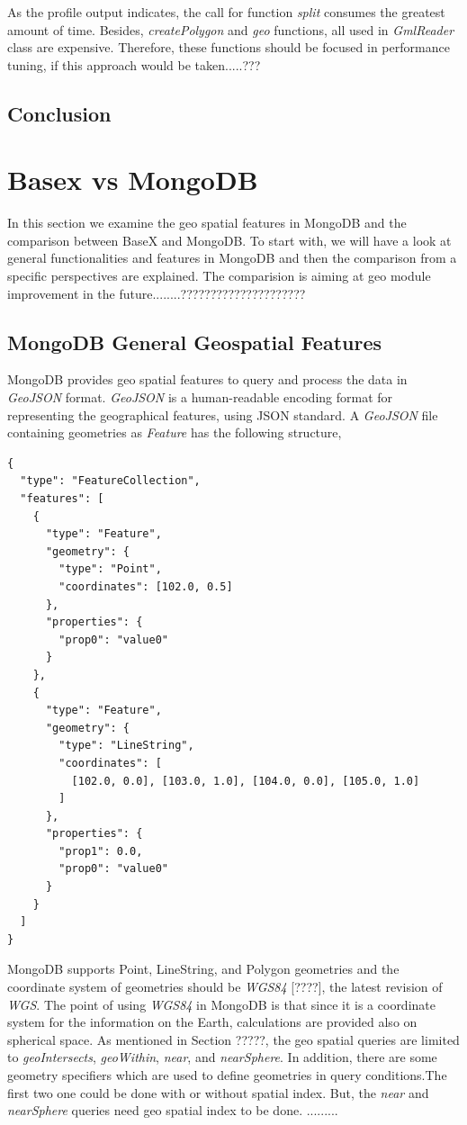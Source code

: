 \documentclass[a4paper,12pt]{article}
\begin{document}
As the profile output indicates, the call for function \textit{split} consumes the greatest amount of time. Besides, \textit{createPolygon} and \textit{geo} functions, all used in \textit{GmlReader} class are expensive. Therefore, these functions should be focused in performance tuning, if this approach would be taken.....???
\subsection{Conclusion}


\section{Basex vs MongoDB}
\label{s.mongo}
In this section we examine the geo spatial features in MongoDB and the comparison between BaseX and MongoDB.
To start with, we will have a look at general functionalities and features in MongoDB and then the comparison from a specific perspectives are explained. The comparision is aiming at geo module improvement in the future........?????????????????????

\subsection {MongoDB General Geospatial Features}
MongoDB provides geo spatial features to query and process the data in \textit{GeoJSON} format. \textit{GeoJSON} is a human-readable encoding format for representing the geographical features, using JSON standard. A \textit{GeoJSON} file containing geometries as \textit{Feature} has the following structure,

\begin{verbatim}
{
  "type": "FeatureCollection",
  "features": [
    {
      "type": "Feature",
      "geometry": {
        "type": "Point",
        "coordinates": [102.0, 0.5]
      },
      "properties": {
        "prop0": "value0"
      }
    },
    {
      "type": "Feature",
      "geometry": {
        "type": "LineString",
        "coordinates": [
          [102.0, 0.0], [103.0, 1.0], [104.0, 0.0], [105.0, 1.0]
        ]
      },
      "properties": {
        "prop1": 0.0,
        "prop0": "value0"
      }
    }
  ]
}
\end{verbatim}


MongoDB supports Point, LineString, and Polygon geometries and the coordinate system of geometries should be \textit{WGS84} [????], the latest revision of \textit{WGS}. The point of using \textit{WGS84} in MongoDB is that since it is a coordinate system for the information on the Earth, calculations are provided also on spherical space. As mentioned in Section ?????, the geo spatial queries are limited to \textit{geoIntersects}, \textit{geoWithin}, \textit{near}, and \textit{nearSphere}. In addition, there are some geometry specifiers which are used to define geometries in query conditions.The first two one could be done with or without spatial index. But, the \textit{near} and \textit{nearSphere} queries need geo spatial index to be done.
.........
\end{document}
